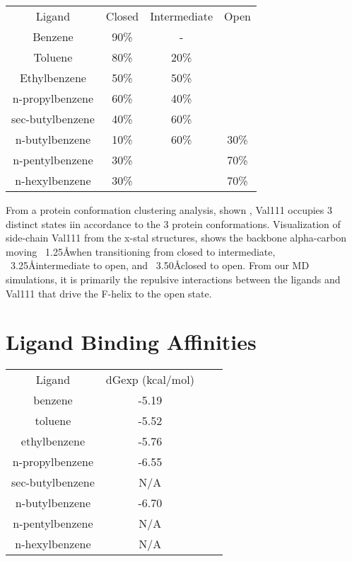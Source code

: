 \documentclass{article}
\begin{document}
\begin{tabular}{|c|c|c|c|}
\hline
Ligand           & Closed & Intermediate & Open  \\
Benzene          & 90\%   & -            &       \\
Toluene          & 80\%   & 20\%         &       \\
Ethylbenzene     & 50\%   & 50\%         &       \\
n-propylbenzene  & 60\%   & 40\%         &       \\
sec-butylbenzene & 40\%   & 60\%         &       \\
n-butylbenzene   & 10\%   & 60\%         & 30\%  \\
n-pentylbenzene  & 30\%   &              & 70\%  \\
n-hexylbenzene   & 30\%   &              & 70\%  \\
\hline
\end{tabular}

From a protein conformation clustering analysis, shown \cite{Merski2015}, Val111 occupies 3 distinct states iin accordance to the 3 protein conformations.
Visualization of side-chain Val111 from the x-stal structures, shows the backbone alpha-carbon moving ~1.25\AA when transitioning from closed to intermediate, ~3.25\AA intermediate to open, and ~3.50\AA closed to open.
From our MD simulations, it is primarily the repulsive interactions between the ligands and Val111 that drive the F-helix to the open state.

\section{Ligand Binding Affinities}
\begin{tabular}{|c|c|c|c|}
\hline
Ligand           & dGexp (kcal/mol) \\
benzene          & -5.19            \\
toluene          & -5.52            \\
ethylbenzene     & -5.76            \\
n-propylbenzene  & -6.55            \\
sec-butylbenzene & N/A              \\
n-butylbenzene   & -6.70            \\
n-pentylbenzene  & N/A              \\
n-hexylbenzene   & N/A              \\
\hline
\end{tabular}
\end{document}
